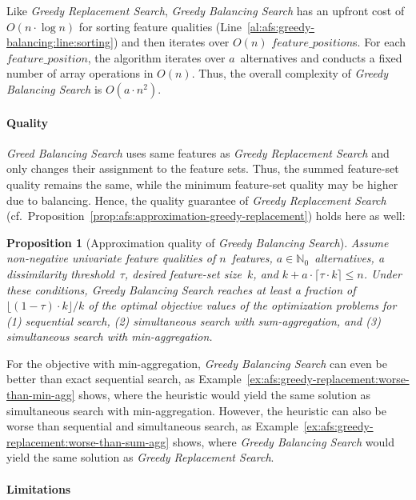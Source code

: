 \documentclass{article}
\newtheorem{proposition}{Proposition}
\theoremstyle{definition}
\begin{document}
Like \emph{Greedy Replacement Search}, \emph{Greedy Balancing Search} has an upfront cost of $O(n \cdot \log n)$ for sorting feature qualities (Line~\ref{al:afs:greedy-balancing:line:sorting}) and then iterates over $O(n)$ $feature\_position$s.
For each $feature\_position$, the algorithm iterates over $a$~alternatives and conducts a fixed number of array operations in $O(n)$.
Thus, the overall complexity of \emph{Greedy Balancing Search} is $O(a \cdot n^2)$.

\paragraph{Quality}

\emph{Greed Balancing Search} uses same features as \emph{Greedy Replacement Search} and only changes their assignment to the feature sets.
Thus, the summed feature-set quality remains the same, while the minimum feature-set quality may be higher due to balancing.
Hence, the quality guarantee of \emph{Greedy Replacement Search} (cf.~Proposition~\ref{prop:afs:approximation-greedy-replacement}) holds here as well:
%
\begin{proposition}[Approximation quality of \emph{Greedy Balancing Search}]
	Assume non-negative univariate feature qualities of $n$~features, $a \in \mathbb{N}_0$~alternatives, a dissimilarity threshold~$\tau$, desired feature-set size~$k$, and $k + a \cdot \lceil \tau \cdot k \rceil \leq n$.
	Under these conditions, \emph{Greedy Balancing Search} reaches at least a fraction of $\lfloor (1 - \tau) \cdot k \rfloor / k$ of the optimal objective values of the optimization problems for (1) sequential search, (2) simultaneous search with sum-aggregation, and (3) simultaneous search with min-aggregation.
	\label{prop:afs:approximation-greedy-balancing}
\end{proposition}
%
For the objective with min-aggregation, \emph{Greedy Balancing Search} can even be better than exact sequential search, as Example~\ref{ex:afs:greedy-replacement:worse-than-min-agg} shows, where the heuristic would yield the same solution as simultaneous search with min-aggregation.
However, the heuristic can also be worse than sequential and simultaneous search, as Example~\ref{ex:afs:greedy-replacement:worse-than-sum-agg} shows, where \emph{Greedy Balancing Search} would yield the same solution as \emph{Greedy Replacement Search}.

\paragraph{Limitations}
\end{document}
